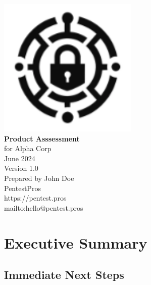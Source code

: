 \documentclass[11pt]{article}
\begin{document}
\begin{titlepage} %
\centering %
\vspace*{1cm} %
\includegraphics[width=0.5\textwidth]{../images/logo.png}\\[1cm] %
{\Huge\bfseries Product Asssessment}\\[0.5cm] %
{\Large for Alpha Corp}\\[0.2cm] %
{\Large June 2024}\\[2cm] %
{\Large Version 1.0}\\[1cm] %
\vfill %
{\large Prepared by John Doe}\\[2cm] %
{\small PentestPros }\\ %
{\small https://pentest.pros}\\ %
{\small mailto:hello@pentest.pros}\\ %
\end{titlepage}

\pagestyle{fancy}
\lhead{}
\rhead{}
\lfoot{}
\cfoot{\thepage}
\rfoot{}

\tableofcontents

\pagebreak

\section{Executive Summary}

\lipsum[1]

\lipsum[2]

\lipsum[4]

\lipsum[3]

\subsection{Immediate Next Steps}
\end{document}
